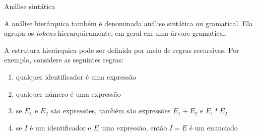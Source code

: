 \begin{frame}[fragile]{Análise sintática}

    A análise hierárquica também é denominada análise sintática ou gramatical. Ela agrupa os \textit{tokens} hierarquicamente, em geral em uma
    árvore gramatical.\pause

    \vspace{0.1in}
    A estrutura hierárquica pode ser definida por meio de regras recursivas. \pause Por exemplo, considere as seguintes regras:
    \pause
    \vspace{0.1in}

    \begin{enumerate}
        \item qualquer identificador é uma expressão
        \pause

        \item qualquer número é uma expressão
        \pause

        \item se $E_1$ e $E_2$ são expressões, também são expressões $E_1 + E_2$ e $E_1 * E_2$
        \pause
    
        \item se $I$ é um identificador e $E$ uma expressão, então $I = E$ é um enunciado
    \end{enumerate}

\end{frame}

